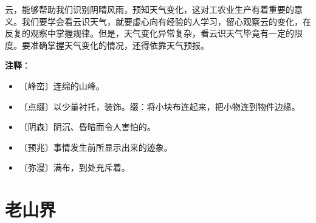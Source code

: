 \documentclass[12pt,UTF-8,openany]{ctexbook}
\begin{document}
\begin{large}
    云，能够帮助我们识别阴晴风雨，预知天气变化，这对工农业生产有着重要的意义。我们要学会看云识天气，就要虚心向有经验的人学习，留心观察云的变化，在反复的观察中掌握规律。但是，天气变化异常复杂，看云识天气毕竟有一定的限度。要准确掌握天气变化的情况，还得依靠天气预报。
    
\end{large}


\newpage

\textbf{注释}：

\vspace{-1em}

\begin{itemize}
    \setlength\itemsep{-0.2em}
    \item 〔峰峦〕连绵的山峰。
    \item 〔点缀〕以少量衬托，装饰。缀：将小块布连起来，把小物连到物件边缘。
    \item 〔阴森〕阴沉、昏暗而令人害怕的。
    \item 〔预兆〕事情发生前所显示出来的迹象。
    \item 〔弥漫〕满布，到处充斥着。
\end{itemize}

\chapter{老山界}
\end{document}
